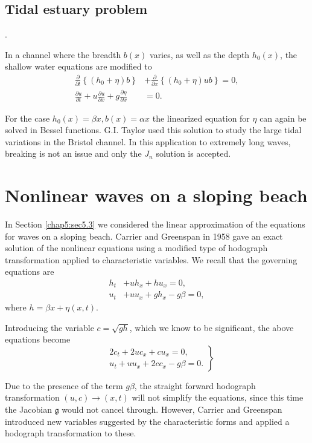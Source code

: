\subsection*{\bf Tidal estuary problem}.

In a channel where the breadth $b(x)$ varies, as well as the depth $h_0(x)$, the shallow water equations are modified to 
\begin{align*}
\frac{\partial}{\partial t}\left\{\left(h_0+\eta\right)b\right\}&+ \frac{\partial}{\partial x}\left\{\left(h_0+\eta\right)ub\right\}=0,\\
\frac{\partial u}{\partial t}+u\frac{\partial u}{\partial x}+g\frac{\partial\eta}{\partial x} &=0.
\end{align*}

For the case $h_0(x)=\beta x, b(x)=\alpha x$ the linearized equation for $\eta$ can again be solved in Bessel functions. G.I. Taylor used this solution to study the large tidal variations in the Bristol channel. In this application to extremely long waves, breaking is not an issue and only the $J_n$ solution is accepted.

\section{Nonlinear waves on a sloping beach}\label{chap5:sec5.4}\pageoriginale 

In Section \ref{chap5:sec5.3} we considered the linear approximation of the equations for waves on a sloping beach. Carrier and Greenspan \cite{key4} in 1958 gave an exact solution of the nonlinear equations using a modified type of hodograph transformation applied to characteristic variables. We recall that the governing equations are 
\begin{align*}
h_t &+ uh_x+hu_x=0,\\
u_t &+ uu_x+gh_x-g\beta =0,
\end{align*}
where $h=\beta x+\eta(x,t)$. 

Introducing the variable $c=\sqrt{gh}$, which we know to be significant, the above equations become
\begin{equation}
\left.
\begin{aligned}
& 2c_t+2uc_x+cu_x=0,\\
& u_t+uu_x+2cc_x-g\beta=0.
\end{aligned}
\right\}\tag{5.20}\label{chap5:eq5.20}
\end{equation}

Due to the presence of the term $g\beta$, the straight forward hodograph transformation $(u,c)\to(x,t)$ will not simplify the equations, since this time the Jacobian $\mathfrak{g}$ would not cancel through. However, Carrier and Greenspan introduced new variables suggested by the characteristic forms and applied a hodograph transformation to these.

